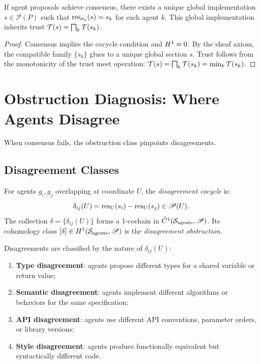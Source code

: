 \documentclass[11pt]{article}
\newcommand{\ProposalSheaf}{\mathscr{P}}
\newcommand{\AgentSite}{\mathcal{S}_{\mathrm{agents}}}
\begin{document}
\begin{theorem}\label{thm:consensus-gluing}
If agent proposals achieve consensus, there exists a unique global
implementation $s \in \ProposalSheaf(P)$ such that
$\mathrm{res}_{\sigma_k}(s) = s_k$ for each agent $k$.  This global
implementation inherits trust $\mathcal{T}(s) = \bigsqcap_k \mathcal{T}(s_k)$.
\end{theorem}

\begin{proof}
Consensus implies the cocycle condition and $H^{1} = 0$.  By the
sheaf axiom, the compatible family $\{s_k\}$ glues to a unique
global section $s$.  Trust follows from the monotonicity of the trust
meet operation: $\mathcal{T}(s) = \bigsqcap_k \mathcal{T}(s_k) = \min_k \mathcal{T}(s_k)$.
\end{proof}


\section{Obstruction Diagnosis: Where Agents Disagree}\label{sec:obstruction-diagnosis}

When consensus fails, the obstruction class pinpoints disagreements.

\subsection{Disagreement Classes}\label{subsec:disagree}

\begin{definition}\label{def:disagree-cocycle}
For agents $g_i, g_j$ overlapping at coordinate $U$, the
\emph{disagreement cocycle} is:
\[
  \delta_{ij}(U) = \res_U(s_i) - \res_U(s_j) \in \ProposalSheaf(U).
\]
The collection $\delta = \{\delta_{ij}(U)\}$ forms a 1-cochain in
$\Cech^1(\AgentSite, \ProposalSheaf)$.  Its cohomology class
$[\delta] \in \Hcoh{1}(\AgentSite, \ProposalSheaf)$ is the
\emph{disagreement obstruction}.
\end{definition}

\begin{definition}\label{def:disagree-taxonomy}
Disagreements are classified by the nature of $\delta_{ij}(U)$:
\begin{enumerate}
  \item \textbf{Type disagreement}: agents propose different types for
    a shared variable or return value;
  \item \textbf{Semantic disagreement}: agents implement different
    algorithms or behaviors for the same specification;
  \item \textbf{API disagreement}: agents use different API conventions,
    parameter orders, or library versions;
  \item \textbf{Style disagreement}: agents produce functionally
    equivalent but syntactically different code.
\end{enumerate}
\end{definition}
\end{document}
